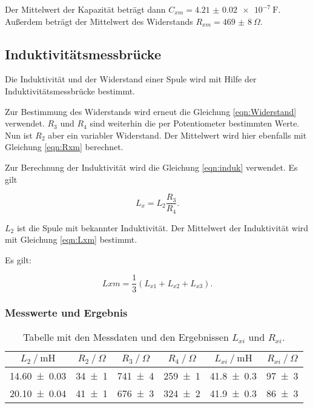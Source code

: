 Der Mittelwert der Kapazität beträgt dann $C_{xm} = \SI{4.21(2)e-7}{\farad}$.
Außerdem beträgt der Mittelwert des Widerstands $R_{xm} =
\SI{469(8)}{\Omega}$.

\subsection{Induktivitätsmessbrücke}
\label{subsec:auswimb}

Die Induktivität und der Widerstand einer Spule wird mit Hilfe der Induktivitätsmessbrücke
bestimmt.

Zur Bestimmung des Widerstands wird erneut die Gleichung \eqref{eqn:Widerstand}
verwendet. $R_3$ und $R_4$ sind weiterhin die per Potentiometer bestimmten Werte.
Nun ist $R_2$ aber ein variabler Widerstand. Der Mittelwert wird hier ebenfalls
mit Gleichung \eqref{eqn:Rxm} berechnet.

Zur Berechnung der Induktivität wird die Gleichung \eqref{eqn:induk} verwendet.
Es gilt

\begin{equation}
  L_x = L_2\frac{R_3}{R_4}.
  \label{eqn:induk}
\end{equation}

$L_2$ ist die Spule mit bekannter Induktivität. Der Mittelwert der Induktivität wird
mit Gleichung \eqref{eqn:Lxm} bestimmt.

Es gilt:

\begin{equation}
  Lxm = \frac{1}{3}(L_{x1} + L_{x2} + L_{x3}).
  \label{eqn:Lxm}
\end{equation}

\subsubsection{Messwerte und Ergebnis}

\begin{table}
  \centering
  \caption{Tabelle mit den Messdaten und den Ergebnissen $L_{xi}$ und $R_{xi}$.}
  \label{tab:Induk17}
  \begin{tabular}{c c c c c c}
    \toprule
    $L_2 \ /\ \si{\milli\henry}$ & $R_2 \ /\ \si{\Omega}$ & $R_3 \ /\ \si{\Omega}$ &
    $R_4 \ /\ \si{\Omega}$ & $L_{xi} \ /\ \si{\milli\henry}$ & $R_{xi} \ /\ \si{\Omega}$ \\
    \midrule
    \num{14.60 +- 0.03} & \num{34 +- 1} & \num{741 +- 4} & \num{259 +- 1} & \num{41.8 +- 0.3} & \num{97 +- 3}\\
    \num{20.10 +- 0.04} & \num{41 +- 1} & \num{676 +- 3} & \num{324 +- 2} & \num{41.9 +- 0.3} & \num{86 +- 3}\\
    \bottomrule
  \end{tabular}
\end{table}

